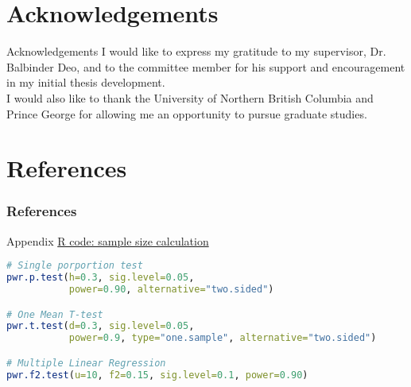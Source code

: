 \documentclass{beamer}\usepackage[]{graphicx}\usepackage[]{xcolor}
\renewcommand*{\bibfont}{\tiny}
\begin{document}
\section{Acknowledgements}
\begin{frame}{Acknowledgements}
I would like to express my gratitude to my supervisor, Dr. Balbinder Deo, and to the committee member for his support and encouragement in my initial thesis development.\\ 
I would also like to thank the University of Northern British Columbia and Prince George for allowing me an opportunity to pursue graduate studies.
\end{frame}


\section{References}
\begin{frame}[allowframebreaks]
    \frametitle{References}
    \bibfont
    \printbibliography
\end{frame}

\appendix
\begin{frame}[fragile]{Appendix}
    \underline{R code: sample size calculation}
    \fontsize{6pt}{6pt}\selectfont
    \begin{lstlisting}[language=R]
# Single porportion test
pwr.p.test(h=0.3, sig.level=0.05, 
           power=0.90, alternative="two.sided")

# One Mean T-test
pwr.t.test(d=0.3, sig.level=0.05,
           power=0.9, type="one.sample", alternative="two.sided")

# Multiple Linear Regression
pwr.f2.test(u=10, f2=0.15, sig.level=0.1, power=0.90)
    \end{lstlisting}
\end{frame}
\end{document}
